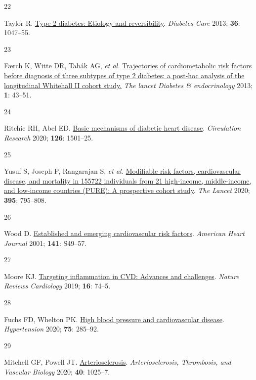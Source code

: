 \documentclass[
  a4paper,
  headsepline=true,
  open=left]{scrbook}
\newlength{\cslhangindent}
\newlength{\csllabelwidth}
\newlength{\cslentryspacingunit} %
\newenvironment{CSLReferences}[2] %
 {%
  \setlength{\parindent}{0pt}
  \ifodd #1
  \let\oldpar\par
  \def\par{\hangindent=\cslhangindent\oldpar}
  \fi
  \setlength{\parskip}{#2\cslentryspacingunit}
 }%
 {}
\newcommand{\CSLLeftMargin}[1]{\parbox[t]{\csllabelwidth}{#1}}
\newcommand{\CSLRightInline}[1]{\parbox[t]{\linewidth - \csllabelwidth}{#1}\break}
\begin{document}
\begin{CSLReferences}{0}{0}
\leavevmode{}%
\CSLLeftMargin{22 }%
\CSLRightInline{Taylor R. \href{https://doi.org/10.2337/dc12-1805}{Type
2 diabetes: Etiology and reversibility}. \emph{Diabetes Care} 2013;
\textbf{36}: 1047--55.}

\leavevmode{}%
\CSLLeftMargin{23 }%
\CSLRightInline{Færch K, Witte DR, Tabák AG, \emph{et al.}
\href{https://doi.org/10.1016/S2213-8587(13)70008-1}{Trajectories of
cardiometabolic risk factors before diagnosis of three subtypes of type
2 diabetes: a post-hoc analysis of the longitudinal Whitehall II cohort
study.} \emph{The lancet Diabetes \& endocrinology} 2013; \textbf{1}:
43--51.}

\leavevmode{}%
\CSLLeftMargin{24 }%
\CSLRightInline{Ritchie RH, Abel ED.
\href{https://doi.org/10.1161/CIRCRESAHA.120.315913}{Basic mechanisms of
diabetic heart disease}. \emph{Circulation Research} 2020; \textbf{126}:
1501--25.}

\leavevmode{}%
\CSLLeftMargin{25 }%
\CSLRightInline{Yusuf S, Joseph P, Rangarajan S, \emph{et al.}
\href{https://doi.org/10.1016/S0140-6736(19)32008-2}{Modifiable risk
factors, cardiovascular disease, and mortality in 155{\hphantom{,}}722
individuals from 21 high-income, middle-income, and low-income countries
(PURE): A prospective cohort study}. \emph{The Lancet} 2020;
\textbf{395}: 795--808.}

\leavevmode{}%
\CSLLeftMargin{26 }%
\CSLRightInline{Wood D.
\href{https://doi.org/10.1067/mhj.2001.109951}{Established and emerging
cardiovascular risk factors}. \emph{American Heart Journal} 2001;
\textbf{141}: S49--57.}

\leavevmode{}%
\CSLLeftMargin{27 }%
\CSLRightInline{Moore KJ.
\href{https://doi.org/10.1038/s41569-018-0144-3}{Targeting inflammation
in CVD: Advances and challenges}. \emph{Nature Reviews Cardiology} 2019;
\textbf{16}: 74--5.}

\leavevmode{}%
\CSLLeftMargin{28 }%
\CSLRightInline{Fuchs FD, Whelton PK.
\href{https://doi.org/10.1161/HYPERTENSIONAHA.119.14240}{High blood
pressure and cardiovascular disease}. \emph{Hypertension} 2020;
\textbf{75}: 285--92.}

\leavevmode{}%
\CSLLeftMargin{29 }%
\CSLRightInline{Mitchell GF, Powell JT.
\href{https://doi.org/10.1161/ATVBAHA.120.314208}{Arteriosclerosis}.
\emph{Arteriosclerosis, Thrombosis, and Vascular Biology} 2020;
\textbf{40}: 1025--7.}


\end{CSLReferences}
\end{document}
